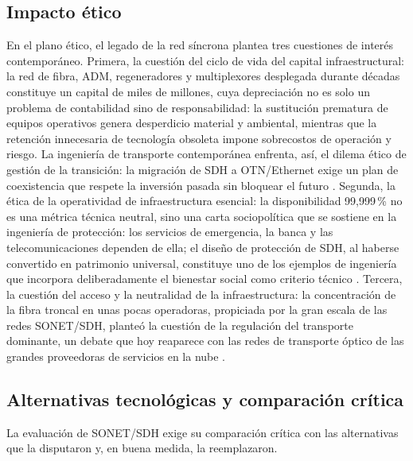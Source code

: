 \documentclass[12pt,a4paper]{article}
\begin{document}
\subsection{Impacto ético}

En el plano ético, el legado de la red síncrona plantea tres cuestiones de interés contemporáneo. Primera, la cuestión del ciclo de vida del capital infraestructural: la red de fibra, ADM, regeneradores y multiplexores desplegada durante décadas constituye un capital de miles de millones, cuya depreciación no es solo un problema de contabilidad sino de responsabilidad: la sustitución prematura de equipos operativos genera desperdicio material y ambiental, mientras que la retención innecesaria de tecnología obsoleta impone sobrecostos de operación y riesgo. La ingeniería de transporte contemporánea enfrenta, así, el dilema ético de gestión de la transición: la migración de SDH a OTN/Ethernet exige un plan de coexistencia que respete la inversión pasada sin bloquear el futuro \cite{tanenbaum2012, ituotn}. Segunda, la ética de la operatividad de infraestructura esencial: la disponibilidad 99{,}999\,\% no es una métrica técnica neutral, sino una carta sociopolítica que se sostiene en la ingeniería de protección: los servicios de emergencia, la banca y las telecomunicaciones dependen de ella; el diseño de protección de SDH, al haberse convertido en patrimonio universal, constituye uno de los ejemplos de ingeniería que incorpora deliberadamente el bienestar social como criterio técnico \cite{stallings2004}. Tercera, la cuestión del acceso y la neutralidad de la infraestructura: la concentración de la fibra troncal en unas pocas operadoras, propiciada por la gran escala de las redes SONET/SDH, planteó la cuestión de la regulación del transporte dominante, un debate que hoy reaparece con las redes de transporte óptico de las grandes proveedoras de servicios en la nube \cite{kurose2017}.

\subsection{Alternativas tecnológicas y comparación crítica}

La evaluación de SONET/SDH exige su comparación crítica con las alternativas que la disputaron y, en buena medida, la reemplazaron.
\end{document}
